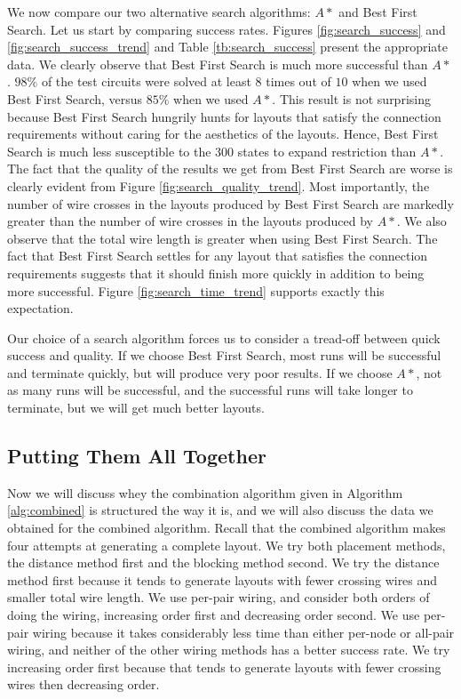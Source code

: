 We now compare our two alternative search algorithms: $A*$ and Best First Search.
Let us start by comparing success rates. Figures \ref{fig:search_success} and
\ref{fig:search_success_trend} and Table \ref{tb:search_success} present the
appropriate data. We clearly observe that Best First Search is much more
successful than $A*$. $98\%$ of the test circuits were solved at least $8$ times
out of $10$ when we used Best First Search, versus $85\%$ when we used $A*$.
This result is not surprising because Best First Search hungrily hunts for
layouts that satisfy the connection requirements without caring for the
aesthetics of the layouts. Hence, Best First Search is much less susceptible to
the $300$ states to expand restriction than $A*$. The fact that the quality of
the results we get from Best First Search are worse
is clearly evident from Figure \ref{fig:search_quality_trend}. Most importantly, the
number of wire crosses in the layouts produced by Best First Search are markedly
greater than the number of wire crosses in the layouts produced by $A*$. We also
observe that the total wire length is greater when using Best First Search. The
fact that Best First Search settles for any layout that satisfies the connection
requirements suggests that it should finish more quickly in addition to being
more successful. Figure \ref{fig:search_time_trend} supports exactly this
expectation.

Our choice of a search algorithm forces us to consider a tread-off between quick
success and quality. If we choose Best First Search, most runs will be successful
and terminate quickly, but will produce very poor results. If we choose $A*$,
not as many runs will be successful, and the successful runs will take longer to
terminate, but we will get much better layouts.

\subsection{Putting Them All Together}
\label{sec:method_combination}

Now we will discuss whey the combination algorithm given in Algorithm
\ref{alg:combined} is structured the way it is, and we will also
discuss the data we obtained for the combined algorithm. Recall that the combined
algorithm makes four attempts at generating a complete layout. We try both
placement methods, the distance method first and the blocking method second. We
try the distance method first because it tends to generate layouts with fewer
crossing wires and smaller total wire length. We use per-pair wiring, and
consider both orders of doing the wiring, increasing order first and decreasing
order second. We use per-pair wiring because it takes considerably
less time than either per-node or all-pair wiring, and neither of the other
wiring methods has a better success rate. We try increasing order first because
that tends to generate layouts with fewer crossing wires then decreasing order.

